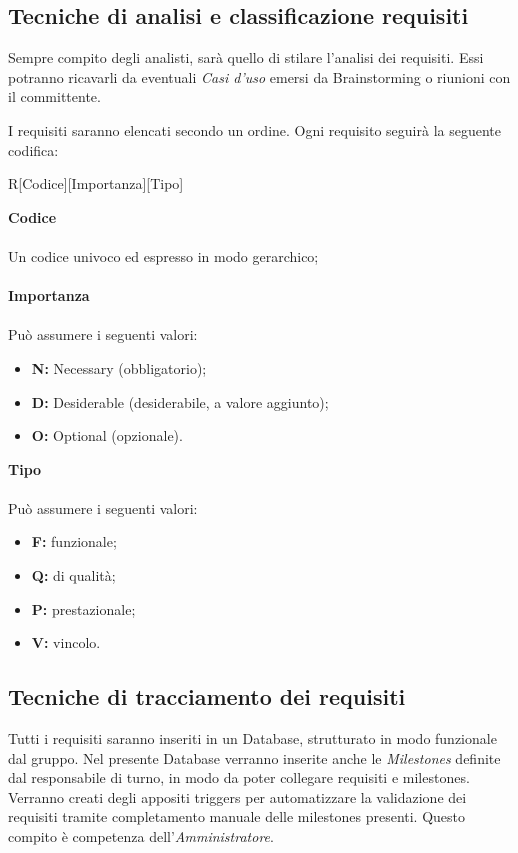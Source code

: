 \documentclass[a4paper]{report}
\begin{document}
	\subsection{Tecniche di analisi e classificazione requisiti}
	Sempre compito degli analisti, sarà quello di stilare l'analisi dei requisiti. Essi potranno ricavarli da eventuali \emph{Casi 
		d'uso} emersi da Brainstorming o riunioni con il committente.
	
	I requisiti saranno elencati secondo un ordine. Ogni requisito seguirà la seguente codifica: \\
	\begin{center}
		R[Codice][Importanza][Tipo]
	\end{center}
	\textbf{Codice} \\ \\ Un codice univoco ed espresso in modo gerarchico;\\ \\
	\textbf{Importanza} \\ \\Può assumere i seguenti valori:
	\begin{itemize}
		\item \textbf{N:} Necessary (obbligatorio);
		\item \textbf{D:} Desiderable (desiderabile, a valore aggiunto);
		\item \textbf{O:} Optional (opzionale).
	\end{itemize}
	\textbf{Tipo} \\ \\Può assumere i seguenti valori:
	\begin{itemize}
		\item \textbf{F:} funzionale;
		\item \textbf{Q:} di qualità;
		\item \textbf{P:} prestazionale;
		\item \textbf{V:} vincolo.
	\end{itemize}
	\subsection{Tecniche di tracciamento dei requisiti}
	Tutti i requisiti saranno inseriti in un Database, strutturato in modo funzionale dal gruppo. Nel presente Database verranno
	inserite anche le \emph{Milestones} definite dal responsabile di turno, in modo da poter collegare requisiti e milestones. 
	Verranno creati degli appositi triggers per automatizzare la validazione dei requisiti tramite completamento manuale delle
	milestones presenti. Questo compito è competenza dell'\emph{Amministratore}.
\end{document}
